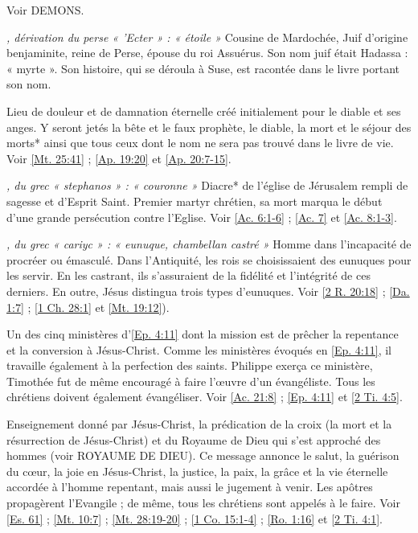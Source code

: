 \begin{multicols}{2}
\textit{}\newline
Voir DEMONS.

\textit{, dérivation du perse « 'Ecter » : « étoile »}\newline
Cousine de Mardochée, Juif d'origine benjaminite, reine de Perse, épouse du roi Assuérus. Son nom juif était Hadassa : « myrte ». Son histoire, qui se déroula à Suse, est racontée dans le livre portant son nom.

\textit{}\newline
Lieu de douleur et de damnation éternelle créé initialement pour le diable et ses anges. Y seront jetés la bête et le faux prophète, le diable, la mort et le séjour des morts* ainsi que tous ceux dont le nom ne sera pas trouvé dans le livre de vie. Voir \vref{Mt. 25:41} ; \vref{Ap. 19:20} et \vref{Ap. 20:7-15}.

\textit{, du grec « stephanos » : « couronne »}\newline
Diacre* de l'église de Jérusalem rempli de sagesse et d'Esprit Saint. Premier martyr chrétien, sa mort marqua le début d'une grande persécution contre l'Eglise. Voir \vref{Ac. 6:1-6} ; \vref{Ac. 7} et \vref{Ac. 8:1-3}.

\textit{, du grec « cariyc » : « eunuque, chambellan castré »}\newline
Homme dans l'incapacité de procréer ou émasculé. Dans l'Antiquité, les rois se choisissaient des eunuques pour les servir. En les castrant, ils s'assuraient de la fidélité et l'intégrité de ces derniers. En outre, Jésus distingua trois types d'eunuques. Voir \vref{2 R. 20:18} ; \vref{Da. 1:7} ; \vref{1 Ch. 28:1} et \vref{Mt. 19:12}).

\textit{}\newline
Un des cinq ministères d'\vref{Ep. 4:11} dont la mission est de prêcher la repentance et la conversion à Jésus-Christ. Comme les ministères évoqués en \vref{Ep. 4:11}, il travaille également à la perfection des saints. Philippe exerça ce ministère, Timothée fut de même encouragé à faire l'œuvre d'un évangéliste. Tous les chrétiens doivent également évangéliser. Voir \vref{Ac. 21:8} ; \vref{Ep. 4:11} et \vref{2 Ti. 4:5}.

\textit{}\newline
Enseignement donné par Jésus-Christ, la prédication de la croix (la mort et la résurrection de Jésus-Christ) et du Royaume de Dieu qui s'est approché des hommes (voir ROYAUME DE DIEU). Ce message annonce le salut, la guérison du cœur, la joie en Jésus-Christ, la justice, la paix, la grâce et la vie éternelle accordée à l'homme repentant, mais aussi le jugement à venir. Les apôtres propagèrent l'Evangile ; de même, tous les chrétiens sont appelés à le faire. Voir \vref{Es. 61} ; \vref{Mt. 10:7} ; \vref{Mt. 28:19-20} ; \vref{1 Co. 15:1-4} ; \vref{Ro. 1:16} et \vref{2 Ti. 4:1}.


\end{multicols}
